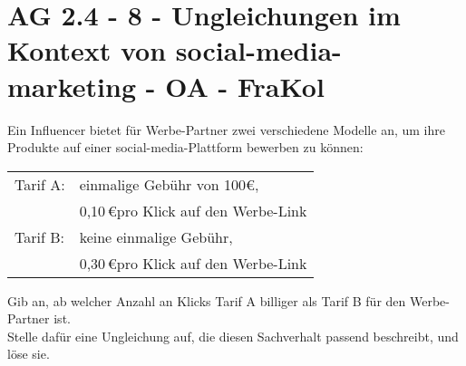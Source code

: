 \section{AG 2.4 - 8 - Ungleichungen im Kontext von social-media-marketing - OA - FraKol}

\begin{beispiel}[AG 2.4]{1}
Ein Influencer bietet für Werbe-Partner zwei verschiedene Modelle an, um ihre Produkte auf einer social-media-Plattform bewerben zu können:

\begin{tabular}{ll}
Tarif A: & einmalige Gebühr von 100\euro{}, \\
& 0,10\,\euro pro Klick auf den Werbe-Link \\
Tarif B: & keine einmalige Gebühr, \\
& 0,30\,\euro pro Klick auf den Werbe-Link
\end{tabular}

Gib an, ab welcher Anzahl an Klicks Tarif A billiger als Tarif B für den Werbe-Partner ist.\\
Stelle dafür eine Ungleichung auf, die diesen Sachverhalt passend beschreibt, und löse sie.

\end{beispiel}